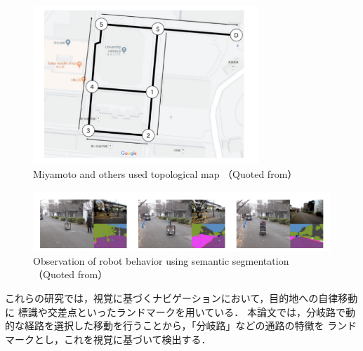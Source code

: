 \begin{figure}[h]
    \centering
     \includegraphics[height=60mm]{images/pdf/topo_meiji.pdf}
     \caption{Miyamoto and others used topological map （Quoted from\cite{miyamoto}）}
     \label{fig:topo_meiji}
\end{figure}
\begin{figure}[h]
    \centering
     \includegraphics[width=120mm]{images/pdf/seg_meiji.pdf}
     \caption{Observation of robot behavior using semantic segmentation （Quoted from\cite{miyamoto}）}
     \label{fig:seg_meiji}
\end{figure}


これらの研究では，視覚に基づくナビゲーションにおいて，目的地への自律移動に
標識や交差点といったランドマークを用いている．
本論文では，分岐路で動的な経路を選択した移動を行うことから，「分岐路」などの通路の特徴を
ランドマークとし，これを視覚に基づいて検出する．

